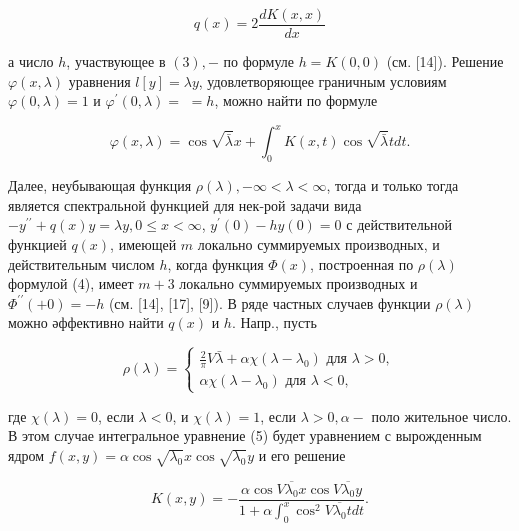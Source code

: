 \documentclass[10pt]{article}
\begin{document}
\[

q(x)=2 \frac{d K(x, x)}{d x}

\]



а число $h$, участвующее в $(3),-$ по формуле $h=K(0,0)$ (см. [14]). Решение $\varphi(x, \lambda)$ уравнения $l[y]=\lambda y$, удовлетворяющее граничным условиям $\varphi(0, \lambda)=1$ и $\varphi^{\prime}(0, \lambda)=$ $=h$, можно найти по формуле



\[

\varphi(x, \lambda)=\cos \sqrt{\bar{\lambda}} x+\int_{0}^{x} K(x, t) \cos \sqrt{\bar{\lambda}} t d t .

\]



Далее, неубывающая функция $\rho(\lambda),-\infty<\lambda<\infty$, тогда и только тогда является спектральной функцией для нек-рой задачи вида $-y^{\prime \prime}+q(x) y=\lambda y, 0 \leqslant x<\infty$, $y^{\prime}(0)-h y(0)=0$ с действительной функцией $q(x)$, имеющей $m$ локально суммируемых производных, и действительным числом $h$, когда функция $\Phi(x)$, построенная по $\rho(\lambda)$ формулой (4), имеет $m+3$ локально суммируемых производных и $\Phi^{\prime \prime}(+0)=-h$ (см. [14], [17], [9]). В ряде частных случаев функции $\rho(\lambda)$ можно әффективно найти $q(x)$ и $h$. Напр., пусть



\[

\rho(\lambda)=\left\{\begin{array}{l}

\frac{2}{\pi} V \bar{\lambda}+\alpha \chi\left(\lambda-\lambda_{0}\right) \text { для } \lambda>0, \\

\alpha \chi\left(\lambda-\lambda_{0}\right) \text { для } \lambda<0,

\end{array}\right.

\]



где $\chi(\lambda)=0$, если $\lambda<0$, и $\chi(\lambda)=1$, если $\lambda>0, \alpha-$ поло жительное число. В этом случае интегральное уравнение (5) будет уравнением с вырожденным ядром $f(x, y)=\alpha \cos \sqrt{\lambda_{0}} x \cos \sqrt{\lambda_{0}} y$ и его решение



\[

K(x, y)=-\frac{\alpha \cos V \overline{\lambda_{0}} x \cos V \overline{\lambda_{0}} y}{1+\alpha \int_{0}^{x} \cos ^{2} V \overline{\lambda_{0}} t d t} .

\]
\end{document}
